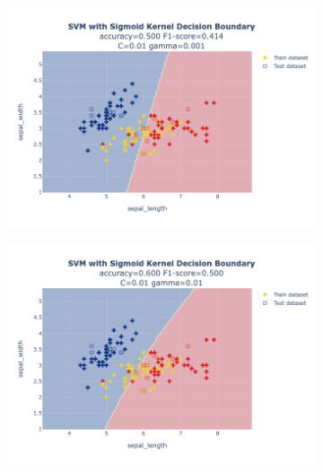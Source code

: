 \documentclass{article}
\begin{document}
\begin{figure}
\begin{subfigure}{0.3\textwidth}
        \includegraphics[scale=.13]{images/implementation/q1/sigmoid_kernel/sepal_length_sepal_width_0.01_0.001.png}
    \end{subfigure}
    \hfill
    \begin{subfigure}{0.3\textwidth}
        \centering
        \includegraphics[scale=.13]{images/implementation/q1/sigmoid_kernel/sepal_length_sepal_width_0.01_0.01.png}
    \end{subfigure}
    \hfill
    \begin{subfigure}{0.3\textwidth}
        \centering

\end{subfigure}
\end{figure}
\end{document}

